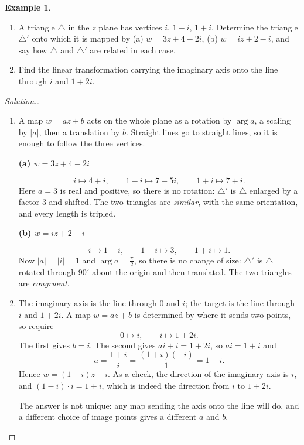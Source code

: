 \documentclass[11pt,a4paper]{article}
\theoremstyle{definition}
\newtheorem{example}[thm]{Example}
\newenvironment{solution}
  {\renewcommand{\qedsymbol}{}\begin{proof}[\textit{Solution}.]}
  {\end{proof}}
\newcommand{\subhead}[1]{%
  \par\medskip\noindent\textbf{#1}\par\nobreak\smallskip}
\begin{document}
\begin{example}
\begin{enumerate}
\item A triangle $\triangle$ in the $z$ plane has vertices $i$, $1-i$, $1+i$.
Determine the triangle $\triangle'$ onto which it is mapped by
(a) $w = 3z + 4 - 2i$, \quad (b) $w = iz + 2 - i$,
and say how $\triangle$ and $\triangle'$ are related in each case.
\item Find the linear transformation carrying the imaginary axis onto the line
through $i$ and $1 + 2i$.
\end{enumerate}
\end{example}
\begin{solution}
\begin{enumerate}
\item A map $w=az+b$ acts on the whole plane as a rotation by $\arg a$, a
scaling by $\left|a\right|$, then a translation by $b$. Straight lines go to
straight lines, so it is enough to follow the three vertices.

\subhead{(a) $w=3z+4-2i$}
$$i\mapsto 4+i,\qquad 1-i\mapsto 7-5i,\qquad 1+i\mapsto 7+i .$$
Here $a=3$ is real and positive, so there is no rotation: $\triangle'$ is
$\triangle$ enlarged by a factor $3$ and shifted. The two triangles are
\emph{similar}, with the same orientation, and every length is tripled.

\subhead{(b) $w=iz+2-i$}
$$i\mapsto 1-i,\qquad 1-i\mapsto 3,\qquad 1+i\mapsto 1 .$$
Now $\left|a\right|=\left|i\right|=1$ and $\arg a=\frac{\pi}{2}$, so there is no
change of size: $\triangle'$ is $\triangle$ rotated through $90^{\circ}$ about
the origin and then translated. The two triangles are \emph{congruent}.

\item The imaginary axis is the line through $0$ and $i$; the target is the
line through $i$ and $1+2i$. A map $w=az+b$ is determined by where it sends two
points, so require
$$0\mapsto i,\qquad i\mapsto 1+2i .$$
The first gives $b=i$. The second gives $ai+i=1+2i$, so $ai=1+i$ and
$$a=\frac{1+i}{i}=\frac{(1+i)(-i)}{1}=1-i .$$
Hence $w=(1-i)z+i$. As a check, the direction of the imaginary axis is $i$, and
$(1-i)\cdot i=1+i$, which is indeed the direction from $i$ to $1+2i$.

The answer is not unique: any map sending the axis onto the line will do, and a
different choice of image points gives a different $a$ and $b$.
\end{enumerate}
\end{solution}
\end{document}
